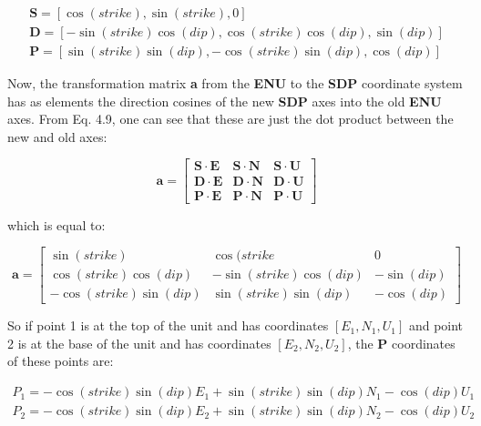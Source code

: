 \documentclass[a4paper , 12pt]{book}
\begin{document}
\begin{equation}
    \begin{split}
        \mathbf{S} = [\cos(strike),\sin(strike),0] \hspace{70pt}  \\
        \mathbf{D} = [-\sin(strike)\cos(dip),\cos(strike)\cos(dip),\sin(dip)] \\
        \mathbf{P} = [\sin(strike)\sin(dip),-\cos(strike)\sin(dip),\cos(dip)]
    \end{split}
\end{equation}

Now, the transformation matrix \textbf{a} from the \textbf{ENU} to the \textbf{SDP} coordinate system has as elements the direction cosines of the new \textbf{SDP} axes into the old \textbf{ENU} axes. From Eq. 4.9, one can see that these are just the dot product between the new and old axes:

\begin{equation*}
    \textbf{a}=
    \begin{bmatrix}
    \mathbf{S}\cdot\mathbf{E} & \mathbf{S}\cdot\mathbf{N} & \mathbf{S}\cdot\mathbf{U} \\
    \mathbf{D}\cdot\mathbf{E} & \mathbf{D}\cdot\mathbf{N} & \mathbf{D}\cdot\mathbf{U} \\
    \mathbf{P}\cdot\mathbf{E} & \mathbf{P}\cdot\mathbf{N} & \mathbf{P}\cdot\mathbf{U}
\end{bmatrix}
\end{equation*}

which is equal to:

\begin{equation}
    \textbf{a}=
    \begin{bmatrix}
    \sin(strike) & \cos(strike & 0 \\
    \cos(strike)\cos(dip) & -\sin(strike)\cos(dip) & -\sin(dip) \\
    -\cos(strike)\sin(dip) & \sin(strike)\sin(dip) & -\cos(dip)
\end{bmatrix}
\end{equation}

So if point 1 is at the top of the unit and has coordinates $[E_1,N_1,U_1]$ and point 2 is at the base of the unit and has coordinates $[E_2,N_2,U_2]$, the \textbf{P} coordinates of these points are:

\begin{equation}
    \begin{split}
        P_1 = -\cos(strike)\sin(dip)E_1+\sin(strike)\sin(dip)N_1-\cos(dip)U_1  \\
        P_2 = -\cos(strike)\sin(dip)E_2+\sin(strike)\sin(dip)N_2-\cos(dip)U_2  \\
    \end{split}
\end{equation}
\end{document}
